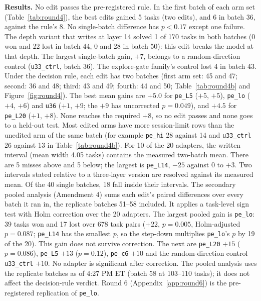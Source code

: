 \textbf{Results.} No edit passes the pre-registered rule. In the first batch of each arm set (Table~\ref{tab:round4}), the best edits gained 5 tasks (two edits), and 6 in batch 36, against the rule's 8. No single-batch difference has $p < 0.17$ except one failure. The depth variant that writes at layer 14 solved 1 of 170 tasks in both batches (0 won and 22 lost in batch 44, 0 and 28 in batch 50): this edit breaks the model at that depth. The largest single-batch gain, $+7$, belongs to a random-direction control (\texttt{u33\_ctrl}, batch 36). The explore-gate family's control lost 4 in batch 43. Under the decision rule, each edit has two batches (first arm set: 45 and 47; second: 36 and 48; third: 43 and 49; fourth: 44 and 50; Table~\ref{tab:round4b} and Figure~\ref{fig:round4}). The best mean gains are $+5.0$ for \texttt{pe\_L5} ($+5$, $+5$), \texttt{pe\_lo} ($+4$, $+6$) and \texttt{u36} ($+1$, $+9$; the $+9$ has uncorrected $p = 0.049$), and $+4.5$ for \texttt{pe\_L20} ($+1$, $+8$). None reaches the required $+8$, so no edit passes and none goes to a held-out test. Most edited arms have more session-limit rows than the unedited arm of the same batch (for example \texttt{pe\_hi} 28 against 14 and \texttt{u33\_ctrl} 26 against 13 in Table~\ref{tab:round4b}). For 10 of the 20 adapters, the written interval (mean width 4.05 tasks) contains the measured two-batch mean. There are 5 misses above and 5 below; the largest is \texttt{pe\_L14}, $-25$ against 0 to $+3$. Two intervals stated relative to a three-layer version are resolved against its measured mean. Of the 40 single batches, 18 fall inside their intervals. The secondary pooled analysis (Amendment 4) sums each edit's paired differences over every batch it ran in, the replicate batches 51--58 included. It applies a task-level sign test with Holm correction over the 20 adapters. The largest pooled gain is \texttt{pe\_lo}: 39 tasks won and 17 lost over 678 task pairs ($+22$, $p = 0.005$, Holm-adjusted $p = 0.087$; \texttt{pe\_L14} has the smallest $p$, so the step-down multiplies \texttt{pe\_lo}'s $p$ by 19 of the 20). This gain does not survive correction. The next are \texttt{pe\_L20} $+15$ ($p = 0.086$), \texttt{pe\_L5} $+13$ ($p = 0.12$), \texttt{pe\_c6} $+10$ and the random-direction control \texttt{u33\_ctrl} $+10$. No adapter is significant after correction. The pooled analysis uses the replicate batches as of 4:27 PM ET (batch 58 at 103--110 tasks); it does not affect the decision-rule verdict. Round 6 (Appendix~\ref{app:round6}) is the pre-registered replication of \texttt{pe\_lo}.

